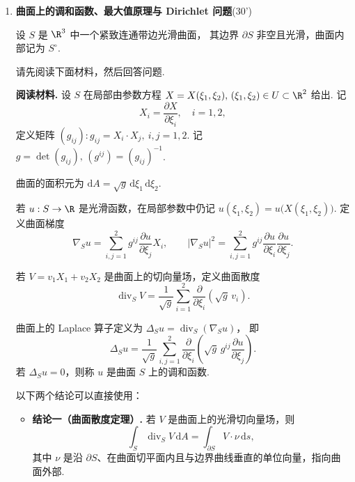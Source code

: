 \begin{enumerate}
\item \textbf{曲面上的调和函数、最大值原理与 Dirichlet 问题}(30')

设 \(S\) 是 \(\R^3\) 中一个紧致连通带边光滑曲面，
其边界 \(\partial S\) 非空且光滑，曲面内部记为 \(S^\circ\).

请先阅读下面材料，然后回答问题.

\textbf{阅读材料.}
设 \(S\) 在局部由参数方程 $\displaystyle X=X(\xi_1,\xi_2),\,(\xi_1,\xi_2)\in U\subset\R^2$
给出. 记
\[
X_i=\frac{\partial X}{\partial\xi_i}, \quad i=1,2,
\]
定义矩阵 \((g_{ij}): g_{ij}=X_i\cdot X_j,\ i,j=1,2\). 
记 $\displaystyle g=\det(g_{ij}),\,(g^{ij})=(g_{ij})^{-1}$.

曲面的面积元为 $\displaystyle\mathrm{d}A=\sqrt g\,\mathrm{d}\xi_1\,\mathrm{d}\xi_2$.

若 \(u:S\to\R\) 是光滑函数，在局部参数中仍记 $\displaystyle u(\xi_1,\xi_2)=u\bigl(X(\xi_1,\xi_2)\bigr)$.
定义曲面梯度
\[
\nabla_Su=\sum_{i,j=1}^{2}g^{ij}\frac{\partial u}{\partial\xi_j}X_i,
\qquad
|\nabla_Su|^2=
\sum_{i,j=1}^{2}g^{ij}
\frac{\partial u}{\partial\xi_i}
\frac{\partial u}{\partial\xi_j}.
\]

若 \(V=v_1X_1+v_2X_2\) 是曲面上的切向量场，定义曲面散度
\[
\operatorname{div}_S V=
\frac{1}{\sqrt g}\sum_{i=1}^{2}
\frac{\partial}{\partial\xi_i}\left(\sqrt g\,v_i\right).
\]

曲面上的 Laplace 算子定义为 $\displaystyle\Delta_Su=\operatorname{div}_S(\nabla_Su)$，
即
\[
\Delta_Su=\frac{1}{\sqrt g}\sum_{i,j=1}^{2}\frac{\partial}{\partial\xi_i}
\left(\sqrt g\,g^{ij}\frac{\partial u}{\partial\xi_j}\right).
\]
若 \(\Delta_Su=0\)，则称 \(u\) 是曲面 \(S\) 上的调和函数.

以下两个结论可以直接使用：
\begin{itemize}
\item[$\bullet$] \textbf{结论一（曲面散度定理）.} 若 \(V\) 是曲面上的光滑切向量场，则
\[
\int_S\operatorname{div}_S V\,\mathrm{d}A
=\int_{\partial S}V\cdot\nu\,\mathrm{d} s,
\]
其中 \(\nu\) 是沿 \(\partial S\)、在曲面切平面内且与边界曲线垂直的单位向量，指向曲面外部.


\end{itemize}
\end{enumerate}
